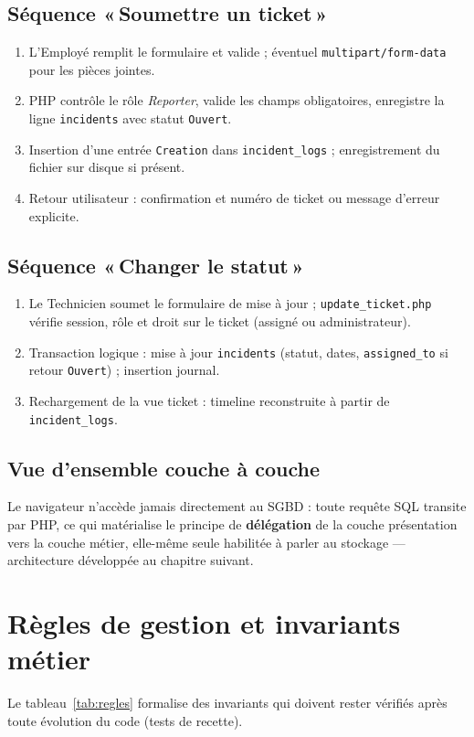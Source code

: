 \subsection{Séquence «\,Soumettre un ticket\,»}
\begin{enumerate}
    \item L'Employé remplit le formulaire et valide ; éventuel \texttt{multipart/form-data} pour
    les pièces jointes.
    \item PHP contrôle le rôle \emph{Reporter}, valide les champs obligatoires, enregistre la ligne
    \texttt{incidents} avec statut \texttt{Ouvert}.
    \item Insertion d'une entrée \texttt{Creation} dans \texttt{incident\_logs} ; enregistrement
    du fichier sur disque si présent.
    \item Retour utilisateur : confirmation et numéro de ticket ou message d'erreur explicite.
\end{enumerate}

\subsection{Séquence «\,Changer le statut\,»}
\begin{enumerate}
    \item Le Technicien soumet le formulaire de mise à jour ; \texttt{update\_ticket.php} vérifie
    session, rôle et droit sur le ticket (assigné ou administrateur).
    \item Transaction logique : mise à jour \texttt{incidents} (statut, dates, \texttt{assigned\_to}
    si retour \texttt{Ouvert}) ; insertion journal.
    \item Rechargement de la vue ticket : timeline reconstruite à partir de \texttt{incident\_logs}.
\end{enumerate}

\subsection{Vue d'ensemble couche à couche}
Le navigateur n'accède jamais directement au SGBD : toute requête SQL transite par PHP, ce qui
matérialise le principe de \textbf{délégation} de la couche présentation vers la couche métier,
elle-même seule habilitée à parler au stockage — architecture développée au chapitre suivant.

\section{Règles de gestion et invariants métier}
Le tableau~\ref{tab:regles} formalise des invariants qui doivent rester vérifiés après toute
évolution du code (tests de recette).

